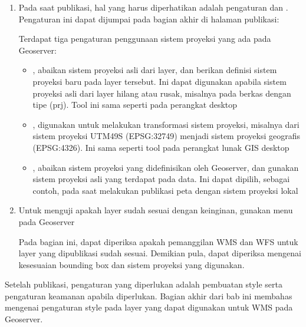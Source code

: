 \documentclass[letterpaper,10pt,english]{sphinxmanual}
\begin{document}
\begin{enumerate}
\item {} 
Pada saat publikasi, hal yang harus diperhatikan adalah pengaturan  dan . Pengaturan ini dapat dijumpai pada bagian akhir di halaman publikasi:


Terdapat tiga pengaturan penggunaan sistem proyeksi yang ada pada Geoserver:
\begin{itemize}
\item {} 
, abaikan sistem proyeksi asli dari layer, dan berikan definisi sistem proyeksi baru pada layer tersebut. Ini dapat digunakan apabila sistem proyeksi asli dari layer hilang atau rusak, misalnya pada berkas dengan tipe  (prj). Tool ini sama seperti  pada perangkat desktop

\item {} 
, digunakan untuk melakukan transformasi sistem proyeksi, misalnya dari sistem proyeksi UTM\sphinxhyphen{}49S (EPSG:32749) menjadi sistem proyeksi geografis (EPSG:4326). Ini sama seperti tool  pada perangkat lunak GIS desktop

\item {} 
, abaikan sistem proyeksi yang didefinisikan oleh Geoserver, dan gunakan sistem proyeksi asli yang terdapat pada data. Ini dapat dipilih, sebagai contoh, pada saat melakukan publikasi peta dengan sistem proyeksi lokal

\end{itemize}

\item {} 
Untuk menguji apakah layer sudah sesuai dengan keinginan, gunakan menu  pada Geoserver


Pada bagian ini, dapat diperiksa apakah pemanggilan WMS dan WFS untuk layer yang dipublikasi sudah sesuai. Demikian pula, dapat diperiksa mengenai kesesuaian bounding box dan sistem proyeksi yang digunakan.

\end{enumerate}

Setelah publikasi, pengaturan yang diperlukan adalah pembuatan style serta pengaturan keamanan apabila diperlukan. Bagian akhir dari bab ini membahas mengenai pengaturan style pada layer yang dapat digunakan untuk WMS pada Geoserver.
\end{document}

